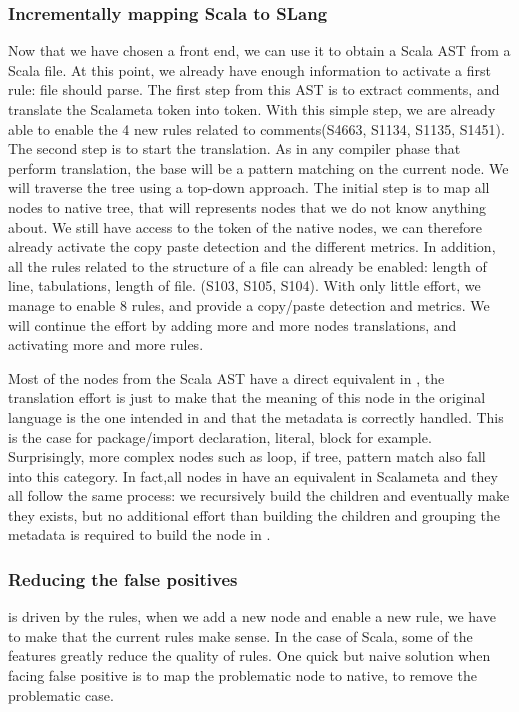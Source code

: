 \subsubsection{Incrementally mapping Scala to SLang}
\label{subsubsec:scala_to_slang}
Now that we have chosen a front end, we can use it to obtain a Scala AST from a Scala file. At this point, we already have enough information to activate a first rule: file should parse.
The first step from this AST is to extract comments, and translate the Scalameta token into \slang{} token.
With this simple step, we are already able to enable the 4 new rules related to comments(S4663, S1134, S1135, S1451).
The second step is to start the translation. As in any compiler phase that perform translation, the base will be a pattern matching on the current node. 
We will traverse the tree using a top-down approach. 
The initial step is to map all nodes to native tree, that will represents nodes that we do not know anything about. 
We still have access to the token of the native nodes, we can therefore already activate the copy paste detection and the different metrics. 
In addition, all the rules related to the structure of a file can already be enabled: length of line, tabulations, length of file. (S103, S105, S104).
With only little effort, we manage to enable 8 rules, and provide a copy/paste detection and metrics. 
We will continue the effort by adding more and more nodes translations, and activating more and more rules.

Most of the nodes from the Scala AST have a direct equivalent in \slang{}, the translation effort is just to make \slang{} that the meaning of this node in the original language is the one intended in \slang{} and that the metadata is correctly handled. This is the case for package/import declaration, literal, block for example. Surprisingly, more complex nodes such as loop, if tree, pattern match also fall into this category.
In fact,all nodes in \slang{} have an equivalent in Scalameta and they all follow the same process: we recursively build the children and eventually make \slang{} they exists, but no additional effort than building the children and grouping the metadata is required to build the node in \slang{}.

\subsubsection{Reducing the false positives}
\label{subsubsec:reducing_false_positives}

\slang{} is driven by the rules, when we add a new node and enable a new rule, we have to make \slang{} that the current rules make sense. 
In the case of Scala, some of the features greatly reduce the quality of rules.
One quick but naive solution when facing false positive is to map the problematic node to native, to remove the problematic case.

